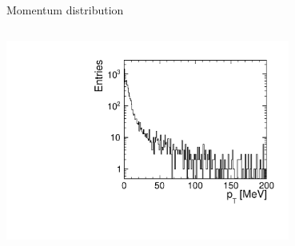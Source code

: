 \documentclass[hyperref={colorlinks=true,pdfpagelabels=false,linkcolor=black}, xcolor=dvipsnames,10pt]{beamer}
\begin{document}
\begin{frame}
\begin{block}{Momentum distribution}
\begin{columns}
		\includegraphics[width=0.7\textwidth]{../figures/incoherentPairs_pT.pdf} 

		\end{columns}	
	\end{block}
	
	
\end{frame}
\end{document}
